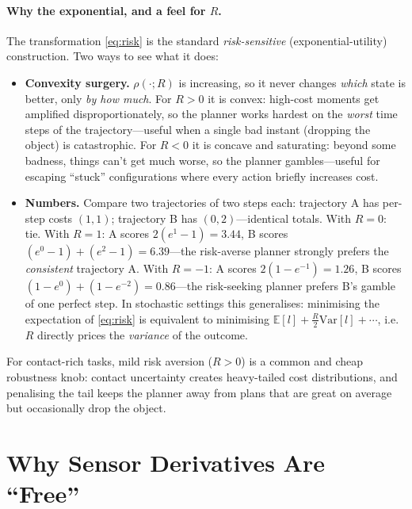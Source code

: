 \documentclass[11pt,twoside]{report}
\theoremstyle{definition}
\theoremstyle{plain}
\theoremstyle{remark}
\newcommand{\0}{\bm{0}}
\begin{document}
\paragraph{Why the exponential, and a feel for $R$.}
The transformation \eqref{eq:risk} is the standard
\emph{risk-sensitive} (exponential-utility) construction. Two ways to
see what it does:
\begin{itemize}
\item \textbf{Convexity surgery.} $\rho(\cdot;R)$ is increasing, so it
      never changes \emph{which} state is better, only \emph{by how
      much}. For $R>0$ it is convex: high-cost moments get amplified
      disproportionately, so the planner works hardest on the
      \emph{worst} time steps of the trajectory---useful when a single
      bad instant (dropping the object) is catastrophic. For $R<0$ it is
      concave and saturating: beyond some badness, things can't get
      much worse, so the planner gambles---useful for escaping
      ``stuck'' configurations where every action briefly increases
      cost.
\item \textbf{Numbers.} Compare two trajectories of two steps each:
      trajectory A has per-step costs $(1,1)$; trajectory B has
      $(0,2)$---identical totals. With $R=0$: tie.
      With $R=1$: A scores $2(e^{1}-1)=3.44$, B scores
      $(e^{0}-1)+(e^{2}-1)=6.39$---the risk-averse planner strongly
      prefers the \emph{consistent} trajectory A.
      With $R=-1$: A scores $2(1-e^{-1})=1.26$, B scores
      $(1-e^{0})+(1-e^{-2})=0.86$---the risk-seeking planner prefers
      B's gamble of one perfect step.
      In stochastic settings this generalises: minimising the
      expectation of \eqref{eq:risk} is equivalent to minimising
      $\mathbb{E}[l]+\tfrac{R}{2}\mathrm{Var}[l]+\cdots$, i.e.\ $R$
      directly prices the \emph{variance} of the outcome.
\end{itemize}
For contact-rich tasks, mild risk aversion ($R>0$) is a common and
cheap robustness knob: contact uncertainty creates heavy-tailed cost
distributions, and penalising the tail keeps the planner away from
plans that are great on average but occasionally drop the object.

\section{Why Sensor Derivatives Are ``Free''}
\label{sec:free-sensors}
\end{document}
